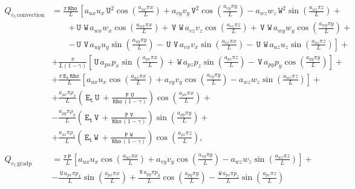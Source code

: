 \documentclass[10pt]{article}
\newcommand{\Rho}{\,\mathtt{Rho}}
\newcommand{\PP}{\,\mathtt{P}}
\newcommand{\U}{\,\mathtt{U}}
\newcommand{\V}{\,\mathtt{V}}
\newcommand{\W}{\,\mathtt{W}}
\newcommand{\Et}{\,\mathtt{E_t}}
\begin{document}
%
%
\begin{equation*}
 \begin{split}
 Q_{e_t \, \text{convection}}&= 
\frac{\pi \Rho \, }{L} \left[a_{ux} u_{x} \U^{2} \cos\left(\frac{a_{ux} \pi x}{L}\right) + a_{vy} v_{y} \V^{2} \cos\left(\frac{a_{vy} \pi y}{L}\right) - a_{wz} w_{z} \W^{2} \sin\left(\frac{a_{wz} \pi z}{L}\right)+\right.\\
 &\qquad\left. + \U \, \W \, a_{wx} w_{x} \cos\left(\frac{a_{wx} \pi x}{L}\right) + \V \, \W \, a_{vz} v_{z} \cos\left(\frac{a_{vz} \pi z}{L}\right) + \V \, \W \, a_{wy} w_{y} \cos\left(\frac{a_{wy} \pi y}{L}\right) +\right.\\
 &\qquad\left.- \U \, \V \, a_{uy} u_{y} \sin\left(\frac{a_{uy} \pi y}{L}\right) - \U \, \V \, a_{vx} v_{x} \sin\left(\frac{a_{vx} \pi x}{L}\right) - \U \, \W \, a_{uz} u_{z} \sin\left(\frac{a_{uz} \pi z}{L}\right)\right] + \\ 
&+ \frac{\pi }{L \left(1 - \gamma\right)}\left[\U \, a_{px} p_{x} \sin\left(\frac{a_{px} \pi x}{L}\right) + \W \, a_{pz} p_{z} \sin\left(\frac{a_{pz} \pi z}{L}\right) - \V \, a_{py} p_{y} \cos\left(\frac{a_{py} \pi y}{L}\right)\right] +\\ 
&+ \frac{\pi \Et \Rho \, }{L} \left[a_{ux} u_{x} \cos\left(\frac{a_{ux} \pi x}{L}\right) + a_{vy} v_{y} \cos\left(\frac{a_{vy} \pi y}{L}\right) - a_{wz} w_{z} \sin\left(\frac{a_{wz} \pi z}{L}\right)\right] + \\ 
&+ \frac{a_{\rho x} \pi \rho_{x} }{L} \left(\Et \U \, + \frac{\PP \, \U}{\Rho \, \left(1 - \gamma\right)}\right) \cos\left(\frac{a_{\rho x} \pi x}{L}\right) + \\ 
&- \frac{a_{\rho y} \pi \rho_{y} }{L} \left(\Et \V \, + \frac{\PP \, \V}{\Rho \, \left(1 - \gamma\right)}\right) \sin\left(\frac{a_{\rho y} \pi y}{L}\right) + \\ 
&+ \frac{a_{\rho z} \pi \rho_{z} }{L} \left(\Et \W \, + \frac{\PP \, \W}{\Rho \, \left(1 - \gamma\right)}\right) \cos\left(\frac{a_{\rho z} \pi z}{L}\right)
,\\
%
&\\
%
 Q_{e_t \, \text{gradp}}&= 
\frac{\pi \PP \, }{L} \left[a_{ux} u_{x} \cos\left(\frac{a_{ux} \pi x}{L}\right) + a_{vy} v_{y} \cos\left(\frac{a_{vy} \pi y}{L}\right) - a_{wz} w_{z} \sin\left(\frac{a_{wz} \pi z}{L}\right)\right]+ \\ 
&- \frac{\U \, a_{px} \pi p_{x} }{L}\sin\left(\frac{a_{px} \pi x}{L}\right)+ \frac{\V \, a_{py} \pi p_{y} }{L}\cos\left(\frac{a_{py} \pi y}{L}\right) - \frac{\W \, a_{pz}\pi p_{z} }{L}\sin\left(\frac{a_{pz} \pi z}{L}\right)

\end{split}
\end{equation*}
\end{document}
